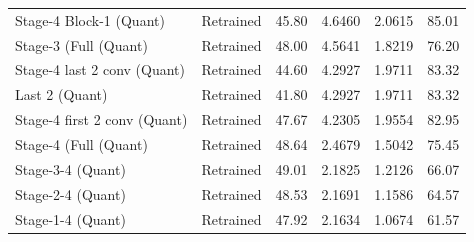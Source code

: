 \begin{table}
\begin{tabular}{llcccc}
Stage-4 Block-1
(Quant) & Retrained & 45.80 & 4.6460 & 2.0615 & 85.01 \\
Stage-3 (Full
(Quant) & Retrained & 48.00 & 4.5641 & 1.8219 & 76.20 \\
Stage-4 last 2 conv
(Quant) & Retrained & 44.60 & 4.2927 & 1.9711 & 83.32 \\
Last 2
(Quant) & Retrained & 41.80 & 4.2927 & 1.9711 & 83.32 \\
Stage-4 first 2 conv
(Quant) & Retrained & 47.67 & 4.2305 & 1.9554 & 82.95 \\
Stage-4 (Full
(Quant) & Retrained & 48.64 & 2.4679 & 1.5042 & 75.45 \\
Stage-3-4
(Quant) & Retrained & 49.01 & 2.1825 & 1.2126 & 66.07 \\
Stage-2-4
(Quant) & Retrained & 48.53 & 2.1691 & 1.1586 & 64.57 \\
Stage-1-4
(Quant) & Retrained & 47.92 & 2.1634 & 1.0674 & 61.57 \\
\bottomrule
\end{tabular}
\end{table}
